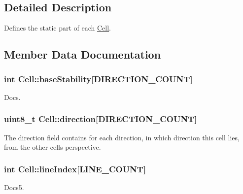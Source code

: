 \subsection{Detailed Description}
Defines the static part of each \hyperlink{struct_cell}{Cell}. 

\subsection{Member Data Documentation}
\subsubsection[{\texorpdfstring{base\+Stability}{baseStability}}]{\setlength{\rightskip}{0pt plus 5cm}int Cell\+::base\+Stability\mbox{[}{\bf D\+I\+R\+E\+C\+T\+I\+O\+N\+\_\+\+C\+O\+U\+NT}\mbox{]}}\hypertarget{struct_cell_aef7fab76ea099cc4a78a1500eb58b0c1}{}\label{struct_cell_aef7fab76ea099cc4a78a1500eb58b0c1}


Docs. 

\subsubsection[{\texorpdfstring{direction}{direction}}]{\setlength{\rightskip}{0pt plus 5cm}uint8\+\_\+t Cell\+::direction\mbox{[}{\bf D\+I\+R\+E\+C\+T\+I\+O\+N\+\_\+\+C\+O\+U\+NT}\mbox{]}}\hypertarget{struct_cell_ad0ce5702eaa1faa24636c1cd83e3a893}{}\label{struct_cell_ad0ce5702eaa1faa24636c1cd83e3a893}


The direction field contains for each direction, in which direction this cell lies, from the other cell\textquotesingle{}s perspective. 

\subsubsection[{\texorpdfstring{line\+Index}{lineIndex}}]{\setlength{\rightskip}{0pt plus 5cm}int Cell\+::line\+Index\mbox{[}{\bf L\+I\+N\+E\+\_\+\+C\+O\+U\+NT}\mbox{]}}\hypertarget{struct_cell_a0cfd0294fd5bd630a481dd191bf2c92d}{}\label{struct_cell_a0cfd0294fd5bd630a481dd191bf2c92d}


Docs5. 

